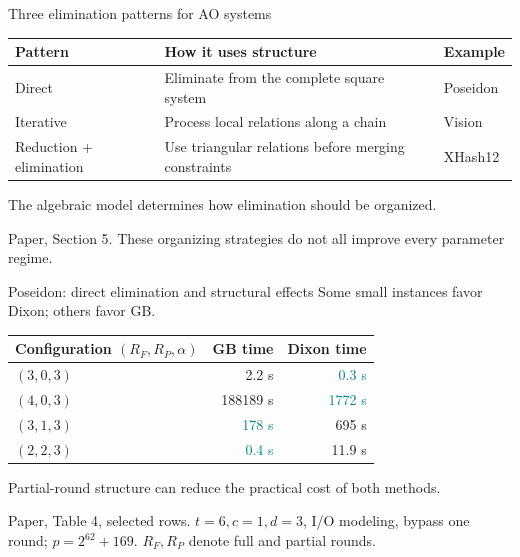 \documentclass[aspectratio=169,11pt,professionalfonts]{beamer}
\newcommand{\src}[1]{\vfill{\color{Muted}\fontsize{7}{8.5}\selectfont #1\par}}
\newcommand{\lead}[1]{{\color{Teal}\large #1}\par\vspace{3mm}}
\begin{document}
\begin{frame}{Three elimination patterns for AO systems}
\renewcommand{\arraystretch}{1.8}
\begin{tabular}{@{}L{2.8cm}L{6.8cm}L{2.6cm}@{}}
\toprule\textbf{Pattern}&\textbf{How it uses structure}&\textbf{Example}\\\midrule
Direct&Eliminate from the complete square system&Poseidon\\
Iterative&Process local relations along a chain&Vision\\
Reduction + elimination&Use triangular relations before merging constraints&XHash12\\\bottomrule
\end{tabular}\par\vspace{5mm}
\lead{The algebraic model determines how elimination should be organized.}
\src{Paper, Section 5. These organizing strategies do not all improve every parameter regime.}
\end{frame}

\begin{frame}{Poseidon: direct elimination and structural effects}
\lead{Some small instances favor Dixon; others favor GB.}
\renewcommand{\arraystretch}{1.5}
\begin{tabular}{@{}L{6.8cm}rr@{}}
\toprule\textbf{Configuration $(R_F,R_P,\alpha)$}&\textbf{GB time}&\textbf{Dixon time}\\\midrule
$(3,0,3)$&2.2 s&\textcolor{Teal}{0.3 s}\\
$(4,0,3)$&188189 s&\textcolor{Teal}{1772 s}\\
$(3,1,3)$&\textcolor{Teal}{178 s}&695 s\\
$(2,2,3)$&\textcolor{Teal}{0.4 s}&11.9 s\\\bottomrule
\end{tabular}\par\vspace{3mm}
Partial-round structure can reduce the practical cost of both methods.
\src{Paper, Table 4, selected rows. $t=6,c=1,d=3$, I/O modeling, bypass one round; $p=2^{62}+169$. $R_F,R_P$ denote full and partial rounds.}
\end{frame}
\end{document}
